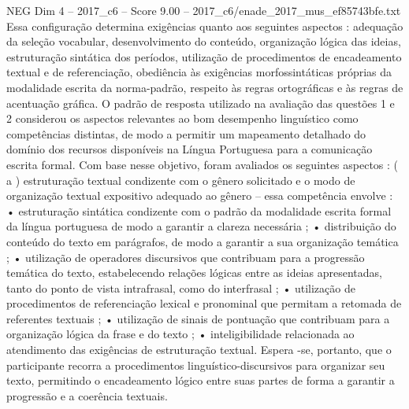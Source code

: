 \begin{textsample}{NEG Dim 4 – 2017\_c6 – Score 9.00 – 2017\_c6/enade\_2017\_mus\_ef85743bfe.txt}
Essa configuração determina exigências quanto aos seguintes aspectos : adequação da seleção vocabular, desenvolvimento do conteúdo, organização lógica das ideias, estruturação sintática dos períodos, utilização de procedimentos de encadeamento textual e de referenciação, obediência às exigências morfossintáticas próprias da modalidade escrita da norma-padrão, respeito às regras ortográficas e às regras de acentuação gráfica.
O padrão de resposta utilizado na avaliação das questões 1 e 2 considerou os aspectos relevantes ao bom desempenho linguístico como competências distintas, de modo a permitir um mapeamento detalhado do domínio dos recursos disponíveis na Língua Portuguesa para a comunicação escrita formal.
Com base nesse objetivo, foram avaliados os seguintes aspectos : ( a ) estruturação textual condizente com o gênero solicitado e o modo de organização textual expositivo adequado ao gênero – essa competência envolve : • estruturação sintática condizente com o padrão da modalidade escrita formal da língua portuguesa de modo a garantir a clareza necessária ; • distribuição do conteúdo do texto em parágrafos, de modo a garantir a sua organização temática ; • utilização de operadores discursivos que contribuam para a progressão temática do texto, estabelecendo relações lógicas entre as ideias apresentadas, tanto do ponto de vista intrafrasal, como do interfrasal ; • utilização de procedimentos de referenciação lexical e pronominal que permitam a retomada de referentes textuais ; • utilização de sinais de pontuação que contribuam para a organização lógica da frase e do texto ; • inteligibilidade relacionada ao atendimento das exigências de estruturação textual.
Espera -se, portanto, que o participante recorra a procedimentos linguístico-discursivos para organizar seu texto, permitindo o encadeamento lógico entre suas partes de forma a garantir a progressão e a coerência textuais.

\end{textsample}
